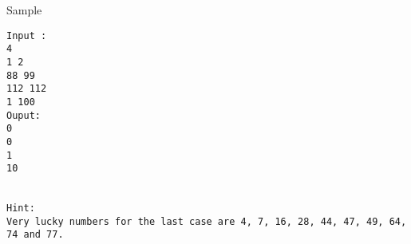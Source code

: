 Sample
\begin{verbatim}
Input :
4 
1 2 
88 99 
112 112 
1 100 
Ouput: 
0 
0 
1 
10 

 
Hint: 
Very lucky numbers for the last case are 4, 7, 16, 28, 44, 47, 49, 64, 74 and 77. 
\end{verbatim}